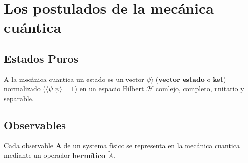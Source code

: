 \chapter{Los postulados de la mecánica cuántica}

\section{Estados Puros}
\begin{definition}
	A la mecánica cuantica un estado es un vector $\psi \rangle$ (\textbf{vector
estado} o \textbf{ket}) normalizado ($\langle \psi | \psi \rangle = 1$) en un
espacio Hilbert $\mathcal{H}$ comlejo, completo, unitario y separable.
\end{definition}

\section{Observables}
\begin{definition}
Cada observable \textbf{A} de un systema físico se representa en la mecánica
cuantica mediante un operador \textbf{hermítico $\tilde A$}.
\end{definition}

\section{}


